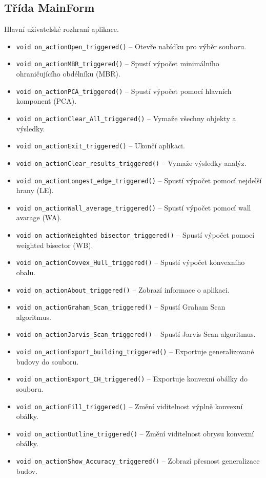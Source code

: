 \subsection{Třída MainForm}
Hlavní uživatelské rozhraní aplikace.

\begin{itemize}
\item \texttt{void on\_actionOpen\_triggered()} – Otevře nabídku pro výběr souboru.
\item \texttt{void on\_actionMBR\_triggered()} – Spustí výpočet minimálního ohraničujícího obdélníku (MBR).
\item \texttt{void on\_actionPCA\_triggered()} – Spustí výpočet pomocí hlavních komponent (PCA).
\item \texttt{void on\_actionClear\_All\_triggered()} – Vymaže všechny objekty a výsledky.
\item \texttt{void on\_actionExit\_triggered()} – Ukončí aplikaci.
\item \texttt{void on\_actionClear\_results\_triggered()} – Vymaže výsledky analýz.
\item \texttt{void on\_actionLongest\_edge\_triggered()} – Spustí výpočet pomocí nejdelší hrany (LE).
\item \texttt{void on\_actionWall\_average\_triggered()} – Spustí výpočet pomocí wall avarage (WA).
\item \texttt{void on\_actionWeighted\_bisector\_triggered()} – Spustí výpočet pomocí weighted bisector (WB).
\item \texttt{void on\_actionCovvex\_Hull\_triggered()} – Spustí výpočet konvexního obalu.
\item \texttt{void on\_actionAbout\_triggered()} – Zobrazí informace o aplikaci.
\item \texttt{void on\_actionGraham\_Scan\_triggered()} – Spustí Graham Scan algoritmus.
\item \texttt{void on\_actionJarvis\_Scan\_triggered()} – Spustí Jarvis Scan algoritmus.
\item \texttt{void on\_actionExport\_building\_triggered()} – Exportuje generalizované budovy do souboru.
\item \texttt{void on\_actionExport\_CH\_triggered()} – Exportuje konvexní obálky do souboru.
\item \texttt{void on\_actionFill\_triggered()} – Změní viditelnost výplně konvexní obálky.
\item \texttt{void on\_actionOutline\_triggered()} – Změní viditelnost obrysu konvexní obálky.
\item \texttt{void on\_actionShow\_Accuracy\_triggered()} – Zobrazí přesnost generalizace budov.
\end{itemize}
